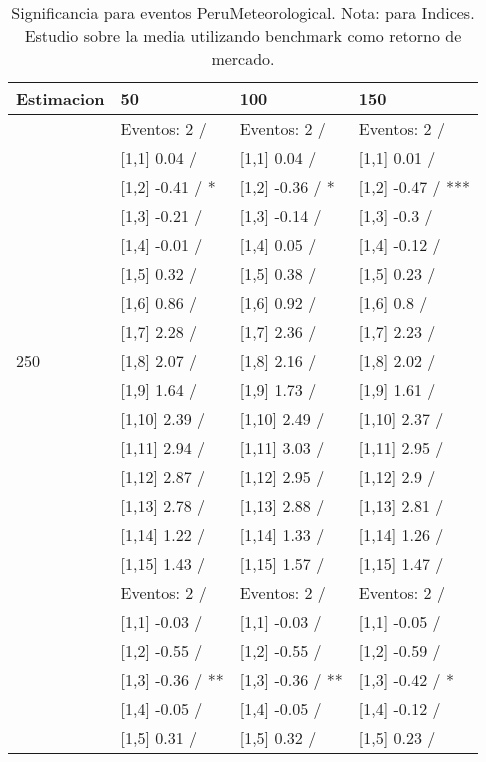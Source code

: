 \begin{table}

\caption{Significancia para eventos PeruMeteorological. Nota: para Indices. Estudio sobre la media utilizando benchmark como retorno de mercado.}
\centering
\begin{tabular}[t]{llll}
\toprule
Estimacion & 50 & 100 & 150\\
\midrule
 & Eventos:  2 / & Eventos:  2 / & Eventos:  2 /\\
 & {}[1,1] 0.04  / & {}[1,1] 0.04  / & {}[1,1] 0.01  /\\
 & {}[1,2] -0.41  / * & {}[1,2] -0.36  / * & {}[1,2] -0.47  / ***\\
 & {}[1,3] -0.21  / & {}[1,3] -0.14  / & {}[1,3] -0.3  /\\
 & {}[1,4] -0.01  / & {}[1,4] 0.05  / & {}[1,4] -0.12  /\\
\addlinespace
 & {}[1,5] 0.32  / & {}[1,5] 0.38  / & {}[1,5] 0.23  /\\
 & {}[1,6] 0.86  / & {}[1,6] 0.92  / & {}[1,6] 0.8  /\\
 & {}[1,7] 2.28  / & {}[1,7] 2.36  / & {}[1,7] 2.23  /\\
250 & {}[1,8] 2.07  / & {}[1,8] 2.16  / & {}[1,8] 2.02  /\\
 & {}[1,9] 1.64  / & {}[1,9] 1.73  / & {}[1,9] 1.61  /\\
\addlinespace
 & {}[1,10] 2.39  / & {}[1,10] 2.49  / & {}[1,10] 2.37  /\\
 & {}[1,11] 2.94  / & {}[1,11] 3.03  / & {}[1,11] 2.95  /\\
 & {}[1,12] 2.87  / & {}[1,12] 2.95  / & {}[1,12] 2.9  /\\
 & {}[1,13] 2.78  / & {}[1,13] 2.88  / & {}[1,13] 2.81  /\\
 & {}[1,14] 1.22  / & {}[1,14] 1.33  / & {}[1,14] 1.26  /\\
\addlinespace
 & {}[1,15] 1.43  / & {}[1,15] 1.57  / & {}[1,15] 1.47  /\\
 & Eventos:  2 / & Eventos:  2 / & Eventos:  2 /\\
 & {}[1,1] -0.03  / & {}[1,1] -0.03  / & {}[1,1] -0.05  /\\
 & {}[1,2] -0.55  / & {}[1,2] -0.55  / & {}[1,2] -0.59  /\\
 & {}[1,3] -0.36  / ** & {}[1,3] -0.36  / ** & {}[1,3] -0.42  / *\\
\addlinespace
 & {}[1,4] -0.05  / & {}[1,4] -0.05  / & {}[1,4] -0.12  /\\
 & {}[1,5] 0.31  / & {}[1,5] 0.32  / & {}[1,5] 0.23  /\\

\end{tabular}
\end{table}
